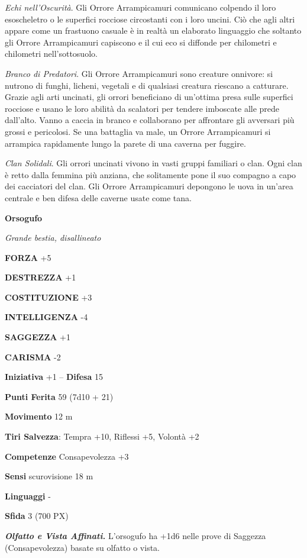 \begin{multicols}{2}
	\textit{Echi nell'Oscurità}. Gli Orrore Arrampicamuri comunicano colpendo il loro esoscheletro o le superfici rocciose circostanti con i loro uncini. Ciò che agli altri appare come un frastuono casuale è in realtà un elaborato linguaggio che soltanto gli Orrore Arrampicamuri capiscono e il cui eco si diffonde per chilometri e chilometri nell'sottosuolo.

	\textit{Branco di Predatori}. Gli Orrore Arrampicamuri sono creature onnivore: si nutrono di funghi, licheni, vegetali e di qualsiasi creatura riescano a catturare. Grazie agli arti uncinati, gli orrori beneficiano di un'ottima presa sulle superfici rocciose e usano le loro abilità da scalatori per tendere imboscate alle prede dall'alto. Vanno a caccia in branco e collaborano per affrontare gli avversari più grossi e pericolosi. Se una battaglia va male, un Orrore Arrampicamuri si arrampica rapidamente lungo la parete di una caverna per fuggire.

	\textit{Clan Solidali}. Gli orrori uncinati vivono in vasti gruppi familiari o clan. Ogni clan è retto dalla femmina più anziana, che solitamente pone il suo compagno a capo dei cacciatori del clan. Gli Orrore Arrampicamuri depongono le uova in un'area centrale e ben difesa delle caverne usate come tana.

	\medskip{}\textbf{Orsogufo}

	\textit{Grande bestia, disallineato}

	\textbf{FORZA} +5

	\textbf{DESTREZZA} +1

	\textbf{COSTITUZIONE} +3

	\textbf{INTELLIGENZA} -4

	\textbf{SAGGEZZA} +1

	\textbf{CARISMA} -2

	\textbf{Iniziativa} +1 -- \textbf{Difesa} 15

	\textbf{Punti Ferita} 59 (7d10 + 21)

	\textbf{Movimento} 12 m

	\textbf{Tiri Salvezza}: Tempra +10, Riflessi +5, Volontà +2

	\textbf{Competenze} Consapevolezza +3

	\textbf{Sensi} scurovisione 18 m

	\textbf{Linguaggi} -

	\textbf{Sfida} 3 (700 PX)

	\textit{\textbf{Olfatto e Vista Affinati.}} L'orsogufo ha +1d6 nelle prove di Saggezza (Consapevolezza) basate su olfatto o vista.


\end{multicols}
